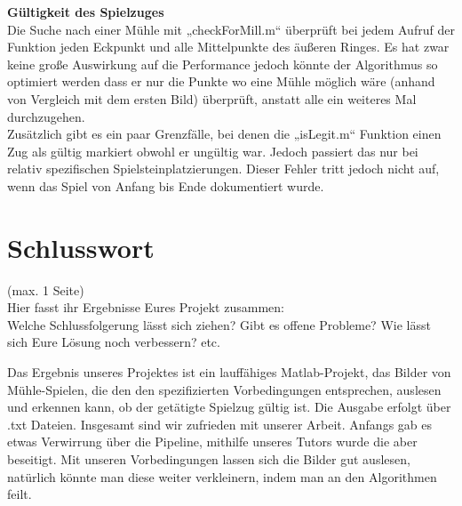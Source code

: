 \documentclass[paper=A4, deutsch]{scrartcl}
\begin{document}
\textbf{Gültigkeit des Spielzuges}\\
Die Suche nach einer Mühle mit „checkForMill.m“ überprüft bei jedem Aufruf der Funktion jeden Eckpunkt und alle Mittelpunkte des äußeren Ringes. Es hat zwar keine große Auswirkung auf die Performance jedoch könnte der Algorithmus so optimiert werden dass er nur die Punkte wo eine Mühle möglich wäre (anhand von Vergleich mit dem ersten Bild) überprüft, anstatt alle ein weiteres Mal durchzugehen. \\
Zusätzlich gibt es ein paar Grenzfälle, bei denen die „isLegit.m“ Funktion einen Zug als gültig markiert obwohl er ungültig war. Jedoch passiert das nur bei relativ spezifischen Spielsteinplatzierungen. Dieser Fehler tritt jedoch nicht auf, wenn das Spiel von Anfang bis Ende dokumentiert wurde.






\section{Schlusswort}
(max. 1 Seite)\\
Hier fasst ihr Ergebnisse Eures Projekt zusammen:\\
Welche Schlussfolgerung lässt sich ziehen? Gibt es offene Probleme? Wie lässt sich Eure Lösung noch verbessern? etc.

Das Ergebnis unseres Projektes ist ein lauffähiges Matlab-Projekt, das Bilder von Mühle-Spielen, die den den spezifizierten Vorbedingungen entsprechen, auslesen und erkennen kann, ob der getätigte Spielzug gültig ist. Die Ausgabe erfolgt über .txt Dateien. 
Insgesamt sind wir zufrieden mit unserer Arbeit. Anfangs gab es etwas Verwirrung über die Pipeline, mithilfe unseres Tutors wurde die aber beseitigt.
Mit unseren Vorbedingungen lassen sich die Bilder gut auslesen, natürlich könnte man diese weiter verkleinern, indem man an den Algorithmen feilt.





\end{document}
